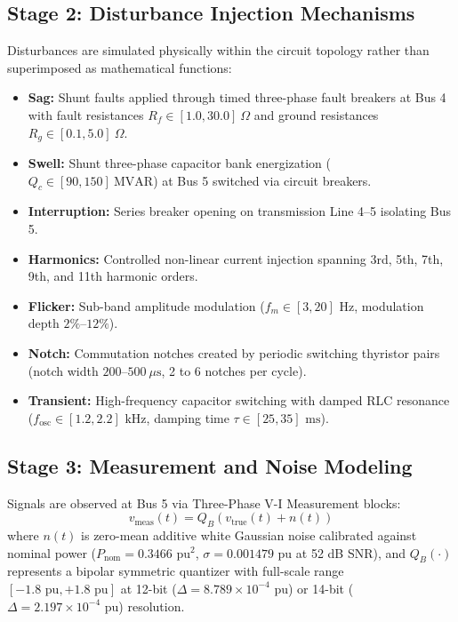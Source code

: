 \documentclass[12pt,a4paper]{report}
\begin{document}
\subsection{Stage 2: Disturbance Injection Mechanisms}
Disturbances are simulated physically within the circuit topology rather than superimposed as mathematical functions:
\begin{itemize}
    \item \textbf{Sag:} Shunt faults applied through timed three-phase fault breakers at Bus 4 with fault resistances $R_f \in [1.0, 30.0]\ \Omega$ and ground resistances $R_g \in [0.1, 5.0]\ \Omega$.
    \item \textbf{Swell:} Shunt three-phase capacitor bank energization ($Q_c \in [90, 150]\ \text{MVAR}$) at Bus 5 switched via circuit breakers.
    \item \textbf{Interruption:} Series breaker opening on transmission Line 4--5 isolating Bus 5.
    \item \textbf{Harmonics:} Controlled non-linear current injection spanning 3rd, 5th, 7th, 9th, and 11th harmonic orders.
    \item \textbf{Flicker:} Sub-band amplitude modulation ($f_m \in [3, 20]\text{ Hz}$, modulation depth $2\%\text{--}12\%$).
    \item \textbf{Notch:} Commutation notches created by periodic switching thyristor pairs (notch width $200\text{--}500\ \mu\text{s}$, 2 to 6 notches per cycle).
    \item \textbf{Transient:} High-frequency capacitor switching with damped RLC resonance ($f_{\text{osc}} \in [1.2, 2.2]\text{ kHz}$, damping time $\tau \in [25, 35]\text{ ms}$).
\end{itemize}

\subsection{Stage 3: Measurement and Noise Modeling}
Signals are observed at Bus 5 via Three-Phase V-I Measurement blocks:
\begin{equation}
v_{\text{meas}}(t) = Q_B\left(v_{\text{true}}(t) + n(t)\right)
\end{equation}
where $n(t)$ is zero-mean additive white Gaussian noise calibrated against nominal power ($P_{\text{nom}} = 0.3466\text{ pu}^2$, $\sigma = 0.001479\text{ pu}$ at 52 dB SNR), and $Q_B(\cdot)$ represents a bipolar symmetric quantizer with full-scale range $[-1.8\text{ pu}, +1.8\text{ pu}]$ at 12-bit ($\Delta = 8.789 \times 10^{-4}\text{ pu}$) or 14-bit ($\Delta = 2.197 \times 10^{-4}\text{ pu}$) resolution.
\end{document}
